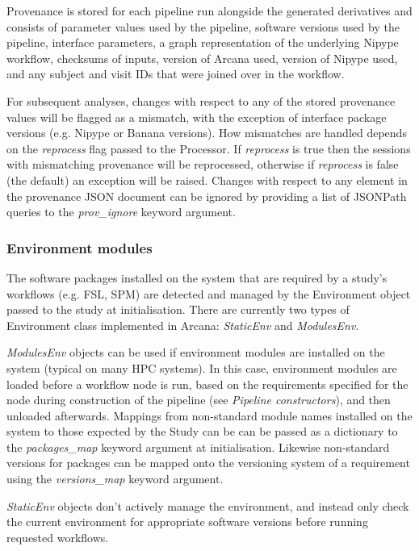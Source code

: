 \documentclass[smallextended]{svjour3}       %
\begin{document}
Provenance is stored for each pipeline run alongside the generated
derivatives and consists of parameter values used by the pipeline,
software versions used by the pipeline, interface parameters,
a graph representation of the underlying Nipype workflow, checksums of inputs,
version of Arcana used, version of Nipype used, and any subject and visit IDs
that were joined over in the workflow.

For subsequent analyses, changes with respect to any of the stored provenance values will
be flagged as a mismatch, with the exception of interface package versions
(e.g. Nipype or Banana versions). How mismatches are handled depends on the \emph{reprocess} flag passed to the
Processor. If \emph{reprocess} is true then the sessions with mismatching provenance
will be reprocessed, otherwise if \emph{reprocess} is false (the default) an exception will be raised.
Changes with respect to any element in the provenance JSON document can be ignored by providing
a list of JSONPath queries to the \emph{prov\_ignore} keyword argument.

\subsubsection*{Environment modules}

The software packages installed on the system that are required by a study's
workflows (e.g. FSL, SPM) are detected and managed by
the Environment object passed to the study at initialisation.
There are currently two types of Environment class implemented in Arcana:
\emph{StaticEnv} and \emph{ModulesEnv}.

\emph{ModulesEnv} objects can be used if environment
modules \citep{furlani_modules:_1991} are installed on the system (typical on many
HPC systems). In this case, environment modules are loaded before a workflow node is run,
based on the requirements specified for the node during construction of the pipeline
(see \emph{Pipeline constructors}), and then unloaded afterwards. Mappings from non-standard
module names installed on the system to those expected by the Study can be
can be passed as a dictionary to the \emph{packages\_map} keyword argument
at initialisation. Likewise non-standard versions for packages can be mapped
onto the versioning system of a requirement using the \emph{versions\_map}
keyword argument.

\emph{StaticEnv} objects don't actively manage the environment,
and instead only check the current environment for appropriate software
versions before running requested workflows.
\end{document}
